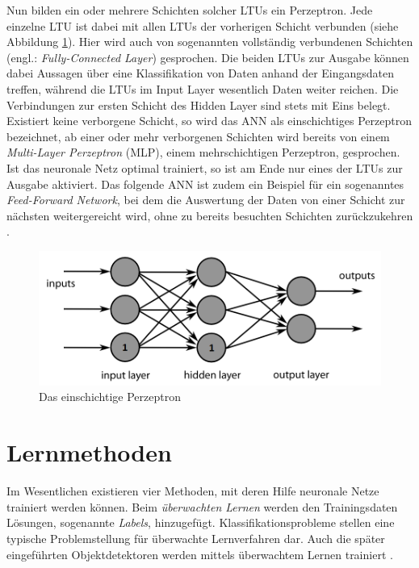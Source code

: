 Nun bilden ein oder mehrere Schichten solcher LTUs ein Perzeptron. Jede einzelne LTU ist dabei mit allen LTUs der vorherigen Schicht verbunden (siehe Abbildung \ref{neural_network}). Hier wird auch von sogenannten vollständig verbundenen Schichten (engl.: \textit{Fully-Connected Layer}) gesprochen. Die beiden LTUs zur Ausgabe können dabei Aussagen über eine Klassifikation von Daten anhand der Eingangsdaten treffen, während die LTUs im Input Layer wesentlich Daten weiter reichen. Die Verbindungen zur ersten Schicht des Hidden Layer sind stets mit Eins belegt. Existiert keine verborgene Schicht, so wird das ANN als einschichtiges Perzeptron bezeichnet, ab einer oder mehr verborgenen Schichten wird bereits von einem \textit{Multi-Layer Perzeptron} (MLP), einem mehrschichtigen Perzeptron, gesprochen. Ist das neuronale Netz optimal trainiert, so ist am Ende nur eines der LTUs zur Ausgabe aktiviert. Das folgende ANN ist zudem ein Beispiel für ein sogenanntes \textit{Feed-Forward Network}, bei dem die Auswertung der Daten von einer Schicht zur nächsten weitergereicht wird, ohne zu bereits besuchten Schichten zurückzukehren \cite{AurelienGeron.2018}.

\begin{figure}[H]
	\begin{center}
		\includegraphics[width=12cm]{Bilder/neural_network.png} 
		\caption[Das einschichtige Perzeptron]{Das einschichtige Perzeptron \cite{Wikipedia.20190123}}
		\label{neural_network}
	\end{center}
\end{figure}

\section*{Lernmethoden}

Im Wesentlichen existieren vier Methoden, mit deren Hilfe neuronale Netze trainiert werden können. Beim \textit{überwachten Lernen} werden den Trainingsdaten Lösungen, sogenannte \textit{Labels}, hinzugefügt. Klassifikationsprobleme stellen eine typische Problemstellung für überwachte Lernverfahren dar. Auch die später eingeführten Objektdetektoren werden mittels überwachtem Lernen trainiert \cite{AurelienGeron.2018}. 

